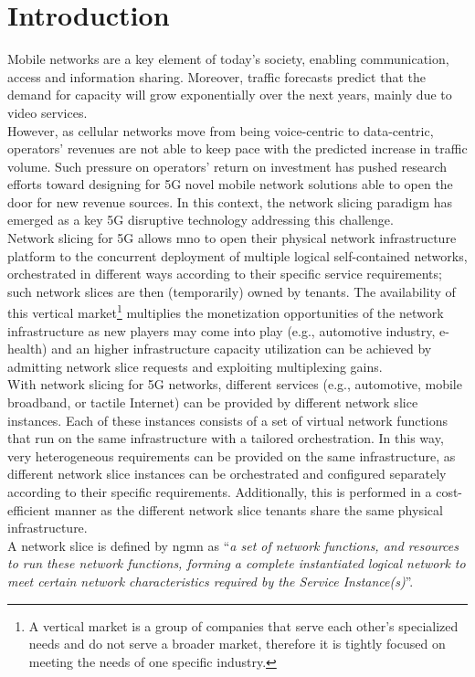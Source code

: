 \documentclass{report}
\begin{document}
\section{Introduction}
Mobile networks are a key element of today's society, enabling communication, access
and information sharing. Moreover, traffic forecasts predict that the
demand for capacity will grow exponentially over the next years, mainly due to
video services. \\
However, as cellular networks move from being voice-centric to
data-centric, operators' revenues are not able to keep pace with the predicted
increase in traffic volume. Such pressure on operators' return on investment has
pushed research efforts toward designing for 5G novel mobile network solutions
able to open the door for new revenue sources. In this context, the network
slicing paradigm has emerged as a key 5G disruptive technology addressing this
challenge.\\
Network slicing for 5G allows \gls{mno} to open
their physical network infrastructure platform to the concurrent deployment
of multiple logical self-contained networks, orchestrated in different ways according
to their specific service requirements; such network slices are then
(temporarily) owned by tenants. The availability of this vertical market\footnote{A vertical market is a group of companies that serve each other's specialized needs and do not serve a broader market, therefore it is tightly focused on meeting the needs of one specific industry.} multiplies
the monetization opportunities of the network infrastructure as new
players may come into play (e.g., automotive industry, e-health) and an higher
infrastructure capacity utilization can be achieved by admitting network slice
requests and exploiting multiplexing gains.\\
With network slicing for 5G networks, different services (e.g., automotive,
mobile broadband, or tactile Internet) can be provided by different network slice
instances. Each of these instances consists of a set of virtual network functions
that run on the same infrastructure with a tailored orchestration. In this way,
very heterogeneous requirements can be provided on the same infrastructure, as
different network slice instances can be orchestrated and configured separately
according to their specific requirements. Additionally, this is performed in a
cost-efficient manner as the different network slice tenants share the same
physical infrastructure.\\
A network slice is defined by \gls{ngmn} as “\textit{a set of network functions, and
resources to run these network functions, forming a complete instantiated
logical network to meet certain network characteristics required by the Service
Instance(s)}”.\\
\end{document}

